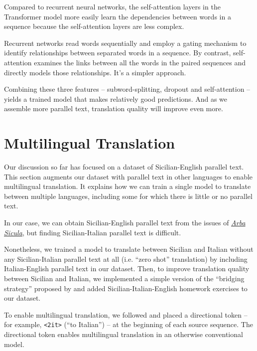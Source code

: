 \documentclass[10pt,letterpaper]{article}
\begin{document}
Compared to recurrent neural networks, the self-attention layers in the Transformer model more easily
learn the dependencies between words in a sequence because the self-attention layers are less complex.

Recurrent networks read words sequentially and employ a gating mechanism to identify relationships
between separated words in a sequence.  By contrast, self-attention examines the links between all the words
in the paired sequences and directly models those relationships. It's a simpler approach.
      
Combining these three features -- subword-splitting, dropout and self-attention --
yields a trained model that makes relatively good predictions.
And as we assemble more parallel text, translation quality will improve even more.
      

\hypertarget{multilingual}{}

\section{Multilingual Translation}

Our discussion so far has focused on a dataset of Sicilian-English parallel text.
This section augments our dataset with parallel text in other languages to enable multilingual translation.
It explains how we can train a single model to translate between multiple languages,
including some for which there is little or no parallel text.

In our case, we can obtain Sicilian-English parallel text from the issues of
\href{https://www.arbasicula.org/}{\textit{Arba Sicula}},
but finding Sicilian-Italian parallel text is difficult.


Nonetheless, we trained a model to translate between Sicilian and Italian
without any Sicilian-Italian parallel text at all (i.e. ``zero shot'' translation)
by including Italian-English parallel text in our dataset.
Then, to improve translation quality between Sicilian and Italian,
we implemented a simple version of the ``bridging strategy'' proposed by
\citet{fan2020beyond} and added Sicilian-Italian-English homework exercises to our dataset.

To enable multilingual translation, we followed \citet{johnson2017zeroshot} and placed a directional
token -- for example, \texttt{<2it>} (``to Italian'') -- at the beginning of each source sequence.
The directional token enables multilingual translation in an otherwise conventional model.
\end{document}

